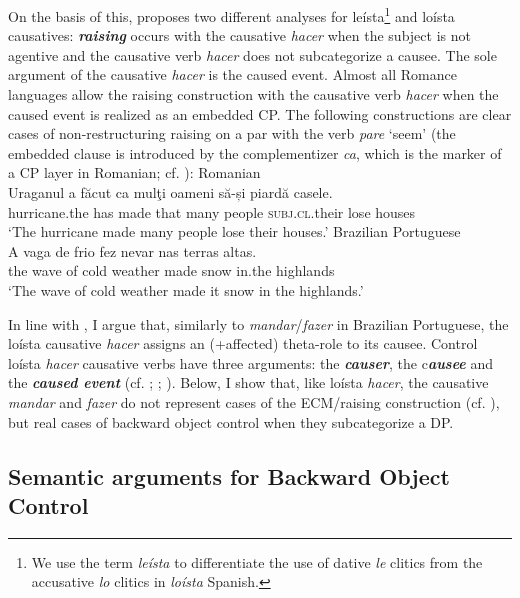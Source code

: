 \documentclass[output=paper]{langsci/langscibook}
\begin{document}
On the basis of this, \citet{Torrego2010} proposes two different analyses for leísta\footnote{We use the term \textit{leísta} to differentiate the use of dative \textit{le} clitics from the accusative \textit{lo} clitics in \textit{loísta} Spanish.} and loísta causatives: \textbf{\textit{raising}} occurs with the causative \textit{hacer} when the subject is not agentive and the causative verb \textit{hacer} does not subcategorize a causee. The sole argument of the causative \textit{hacer} is the caused event. Almost all Romance languages allow the raising construction with the causative verb \textit{hacer} when the caused event is realized as an embedded CP. The following constructions are clear cases of non-restructuring raising on a par with the verb \textit{pare} ‘seem’ (the embedded clause is introduced by the complementizer \textit{ca}, which is the marker of a CP layer in Romanian; cf. \citealt{Alboiu2007}):
\ea%
    \label{ex:moreno:8}
    \ea  Romanian\\
    \gll Uraganul    a    făcut   ca   mulţi  oameni  să-și              piardă casele.   \\
         hurricane.the has made  that many people   \textsc{subj.cl}.their lose     houses \\
    \glt ‘The hurricane made many people lose their houses.’
    \ex  Brazilian Portuguese\\
    \gll A   vaga  de frio     fez   nevar   nas     terras altas.  \\
         the wave of cold weather   made  snow  in.the highlands\\
    \glt ‘The wave of cold weather made it snow in the highlands.’ 
    \z
\z

In line with \citet{López2001}, I argue that, similarly to \textit{mandar}/\textit{fazer} in Brazilian Portuguese, the loísta causative \textit{hacer} assigns an (+affected) theta-role to its causee. Control loísta \textit{hacer} causative verbs have three arguments: the \textbf{\textit{causer}}, the c\textbf{\textit{ausee} }and the \textbf{\textit{caused event}} (cf. \citealt{Zubizarreta1985}; \citealt{Alsina1992}; \citealt{Ippolito2000}). 
Below, I show that, like loísta \textit{hacer}, the causative \textit{mandar} and \textit{fazer} do not represent cases of the ECM\slash raising construction (cf. \citealt{Farrell1995}), but real cases of backward object control when they subcategorize a DP.

\subsection{Semantic arguments for Backward Object Control} %
\end{document}
